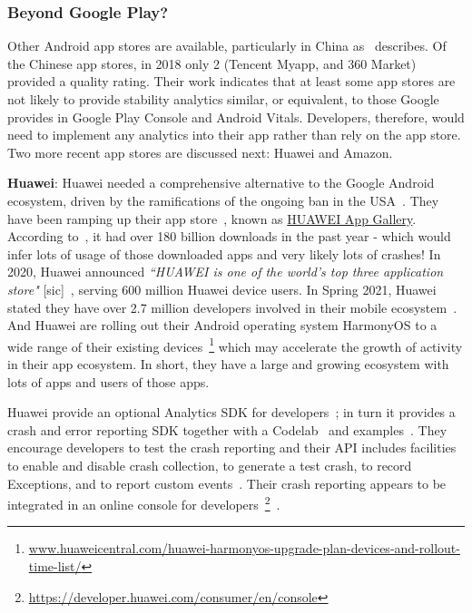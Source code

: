 \subsubsection{Beyond Google Play?}
Other Android app stores are available, particularly in China as~ describes. Of the Chinese app stores, in 2018 only 2 (Tencent Myapp, and 360 Market) provided a quality rating. Their work indicates that at least some app stores are not likely to provide stability analytics similar, or equivalent, to those Google provides in Google Play Console and Android Vitals. Developers, therefore, would need to implement any analytics into their app rather than rely on the app store. Two more recent app stores are discussed next: Huawei and Amazon.

\textbf{Huawei}: 
Huawei needed a comprehensive alternative to the Google Android ecosystem, driven by the ramifications of the ongoing ban in the USA~. 
They have been ramping up their app store~, known as \href{https://appgallery.huawei.com/}{HUAWEI App Gallery}. According to~, it had over 180 billion downloads in the past year - which would infer lots of usage of those downloaded apps and very likely lots of crashes! 
%
In 2020, Huawei announced \emph{``HUAWEI is one of the world's top three application store"} [sic]~, serving 600 million Huawei device users. In Spring 2021, Huawei stated they have over 2.7 million developers involved in their mobile ecosystem~. 
And Huawei are rolling out their Android operating system HarmonyOS to a wide range of their existing devices~\footnote{\href{https://www.huaweicentral.com/huawei-harmonyos-upgrade-plan-devices-and-rollout-time-list/}{www.huaweicentral.com/huawei-harmonyos-upgrade-plan-devices-and-rollout-time-list/}} which may accelerate the growth of activity in their app ecosystem. In short, they have a large and growing ecosystem with lots of apps and users of those apps.

Huawei provide an optional Analytics SDK for developers~; in turn it provides a crash and error reporting SDK together with a Codelab~ and examples~. They encourage developers to test the crash reporting and their API includes facilities to enable and disable crash collection, to generate a test crash, to record Exceptions, and to report custom events~. 
Their crash reporting appears to be integrated in an online console for developers~\footnote{\url{https://developer.huawei.com/consumer/en/console}}~. 


